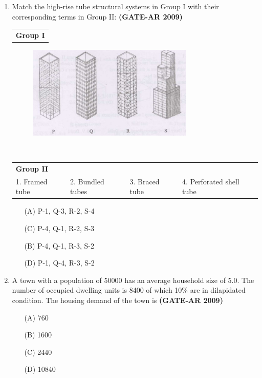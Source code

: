 \documentclass[a4paper,10pt]{article}
\begin{document}
\begin{enumerate}
\newpage

    \item Match the high-rise tube structural systems in Group I with their corresponding terms in Group II: \textbf{(GATE-AR 2009)} \\
    \begin{tabular}{ l }
	\textbf{Group I} \\
	\end{tabular}
	\begin{figure}[h!]
        \centering
        \includegraphics[width=0.75\textwidth]{Pic02.jpg}
	\end{figure} \\
	\begin{tabular}{ l l l l }
	\textbf{Group II} & & & \\
	1. Framed tube & 2. Bundled tubes & 3. Braced tube & 4. Perforated shell tube \\
	\end{tabular}
	\begin{multicols}{2}
	\begin{itemize}
        \item[(A)] P-1, Q-3, R-2, S-4
        \item[(C)] P-4, Q-1, R-2, S-3
        \item[(B)] P-4, Q-1, R-3, S-2
        \item[(D)] P-1, Q-4, R-3, S-2
    \end{itemize}
	\end{multicols}

    \item A town with a population of 50000 has an average household size of 5.0. The number of occupied dwelling units is 8400 of which 10\% are in dilapidated condition. The housing demand of the town is \textbf{(GATE-AR 2009)}
    \begin{multicols}{4}
	\begin{itemize}
        \item[(A)] 760
        \item[(B)] 1600
        \item[(C)] 2440
        \item[(D)] 10840
    \end{itemize}
	\end{multicols}


\end{enumerate}
\end{document}
